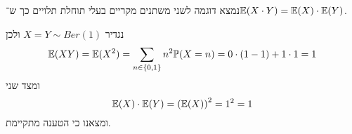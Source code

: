 \question{}
נמצא דוגמה לשני משתנים מקריים בעלי תוחלת תלויים כך ש־$\mathbb{E}(X \cdot Y) = \mathbb{E}(X) \cdot \mathbb{E}(Y)$.
\begin{solution}
	נגדיר $X = Y \sim Ber(1)$ ולכן
	\[
		\mathbb{E}(XY)
		= \mathbb{E}(X^2)
		= \sum_{n \in \{0, 1\}} n^2 \mathbb{P}(X = n)
		= 0 \cdot (1 - 1) + 1 \cdot 1
		= 1
	\]
	ומצד שני
	\[
		\mathbb{E}(X) \cdot \mathbb{E}(Y)
		= {(\mathbb{E}(X))}^2
		= 1^2
		= 1
	\]
	ומצאנו כי הטענה מתקיימת.
\end{solution}


